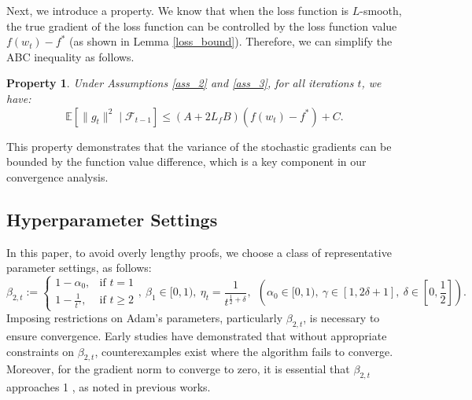 \documentclass{article} %
\newtheorem{property}{\textbf{Property}}
\begin{document}


Next, we introduce a property. We know that when the loss function is $L$-smooth, the true gradient of the loss function can be controlled by the loss function value $f(w_{t}) - f^{*}$ (as shown in Lemma \ref{loss_bound}). Therefore, we can simplify the ABC inequality as follows.


\begin{property}\label{property_-1}
Under Assumptions \ref{ass_2} and \ref{ass_3}, for all iterations \( t \), we have:
\[
\mathbb{E}[\|g_{t} \|^2 \mid \mathscr{F}_{t-1}] \leq (A + 2 L_f B) (f(w_t) - f^*) + C.
\]
\end{property}

This property demonstrates that the variance of the stochastic gradients can be bounded by the function value difference, which is a key component in our convergence analysis.




\subsection{Hyperparameter Settings}\label{setting}


In this paper, to avoid overly lengthy proofs, we choose a class of representative parameter settings, as follows:
\[\beta_{2,t} := \left\{
\begin{array}{ll}
1-\alpha_{0}, & \text{if } t = 1 \\
1 - \frac{1}{t^{\gamma}}, & \text{if } t \ge 2
\end{array}
\right. , \ \beta_{1} \in [0, 1),\ \eta_{t}=\frac{1}{t^{\frac{1}{2}+\delta}},\ \ \left(\alpha_{0}\in [0,1),\ \gamma\in[1,2\delta+1],\  \delta\in \left[0,\frac{1}{2}\right]\right).\]
Imposing restrictions on Adam's parameters, particularly \( \beta_{2,t} \), is necessary to ensure convergence. Early studies \citep{reddi2018convergence} have demonstrated that without appropriate constraints on \( \beta_{2,t} \), counterexamples exist where the algorithm fails to converge. Moreover, for the gradient norm to converge to zero, it is essential that \( \beta_{2,t} \) approaches 1 \citep{zou2019sufficient,he2023convergence}, as noted in previous works.
\end{document}
